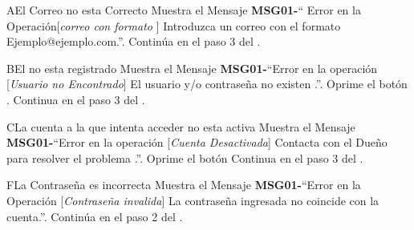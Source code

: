 	\begin{UCtrayectoriaA}{A}{El Correo no esta Correcto}
			\UCpaso Muestra el Mensaje {\bf MSG01-}`` Error en la Operación[{\em correo con formato }] Introduzca un correo con el formato Ejemplo@ejemplo.com.''.
			\UCpaso Continúa en el paso 3 del .
		\end{UCtrayectoriaA}
		\begin{UCtrayectoriaA}{B}{El \UCactor no esta registrado}
			\UCpaso Muestra el Mensaje {\bf MSG01-}``Error en la operación [{\em Usuario no Encontrado}] El usuario y/o contraseña no existen .''.
			\UCpaso[\UCactor] Oprime el botón .
			\UCpaso[\UCactor] Continua en el paso 3 del .
		\end{UCtrayectoriaA}		
		\begin{UCtrayectoriaA}{C}{La cuenta a la que intenta acceder no esta activa}
			\UCpaso Muestra el Mensaje {\bf MSG01-}``Error en la operación [{\em Cuenta Desactivada}] Contacta con el Dueño para resolver el problema .''.
			\UCpaso[\UCactor] Oprime el botón 
			\UCpaso Continua en el paso 3 del .
		\end{UCtrayectoriaA}
		\begin{UCtrayectoriaA}{F}{La Contraseña es incorrecta}
			\UCpaso Muestra el Mensaje {\bf MSG01-}``Error en la Operación [{\em Contraseña invalida}] La contraseña ingresada no coincide con la cuenta.''.
			\UCpaso Continúa en el paso 2 del .
		\end{UCtrayectoriaA}

